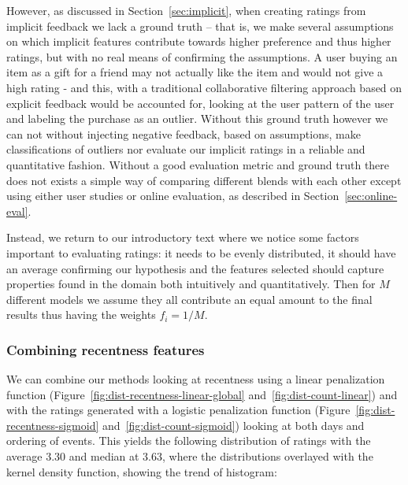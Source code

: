 However, as discussed in Section~\ref{sec:implicit}, when creating ratings from
implicit feedback we lack a ground truth -- that is, we make several
assumptions on which implicit features contribute towards higher preference and
thus higher ratings, but with no real means of confirming the assumptions. A
user buying an item as a gift for a friend may not actually like the item and
would not give a high rating - and this, with a traditional collaborative
filtering approach based on explicit feedback would be accounted for, looking
at the user pattern of the user and labeling the purchase as an outlier.
Without this ground truth however we can not without injecting negative
feedback, based on assumptions, make classifications of outliers nor evaluate
our implicit ratings in a reliable and quantitative fashion. Without a good
evaluation metric and ground truth there does not exists a simple way of
comparing different blends with each other except using either user studies or
online evaluation, as described in Section~\ref{sec:online-eval}.

Instead, we return to our introductory text where we notice some factors
important to evaluating ratings: it needs to be evenly distributed, it should
have an average confirming our hypothesis and the features selected should
capture properties found in the domain both intuitively and quantitatively.  Then
for $M$ different models we assume they all contribute an equal amount to the
final results thus having the weights $f_i = 1/M$.

\subsubsection{Combining recentness features}

We can combine our methods looking at recentness using a linear penalization
function (Figure~\ref{fig:dist-recentness-linear-global}
and~\ref{fig:dist-count-linear}) and with the ratings generated with a logistic
penalization function (Figure~\ref{fig:dist-recentness-sigmoid}
and~\ref{fig:dist-count-sigmoid}) looking at both days and ordering of events.
This yields the following distribution of ratings with the average $3.30$ and
median at $3.63$, where the distributions overlayed with the kernel density
function, showing the trend of histogram:

